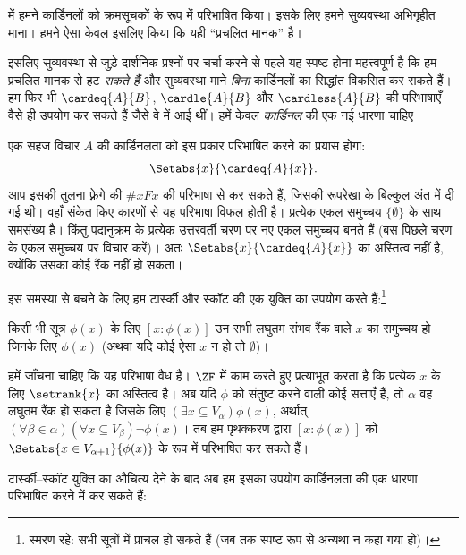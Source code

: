 \documentclass[../../../include/open-logic-section]{subfiles}
\begin{document}

 में हमने कार्डिनलों
को क्रमसूचकों के रूप में परिभाषित किया। इसके लिए हमने सुव्यवस्था अभिगृहीत
माना। हमने ऐसा केवल इसलिए किया कि यही ``प्रचलित मानक'' है।

इसलिए सुव्यवस्था से जुड़े दार्शनिक प्रश्नों पर चर्चा करने से पहले यह स्पष्ट
होना महत्त्वपूर्ण है कि हम प्रचलित मानक से हट \emph{सकते हैं} और सुव्यवस्था
माने \emph{बिना} कार्डिनलों का सिद्धांत विकसित कर सकते हैं। हम फिर भी
$\cardeq{A}{B}$, $\cardle{A}{B}$ और $\cardless{A}{B}$ की परिभाषाएँ वैसे
ही उपयोग कर सकते हैं जैसे वे  में आई थीं। हमें केवल
\emph{कार्डिनल} की एक नई धारणा चाहिए।

एक सहज विचार $A$ की कार्डिनलता को इस प्रकार परिभाषित करने का प्रयास होगा:
\[
	\Setabs{x}{\cardeq{A}{x}}.
\]
आप इसकी तुलना फ़्रेगे की $\#xFx$ की परिभाषा से कर सकते हैं, जिसकी रूपरेखा
 के बिल्कुल अंत में दी गई थी। वहाँ संकेत किए कारणों
से यह परिभाषा विफल होती है। प्रत्येक एकल समुच्चय $\{\emptyset\}$ के साथ
समसंख्य है। किंतु पदानुक्रम के प्रत्येक उत्तरवर्ती चरण पर नए एकल समुच्चय
बनते हैं (बस पिछले चरण के एकल समुच्चय पर विचार करें)। अतः
$\Setabs{x}{\cardeq{A}{x}}$ का अस्तित्व नहीं है, क्योंकि उसका कोई रैंक नहीं
हो सकता।

इस समस्या से बचने के लिए हम टार्स्की और स्कॉट की एक युक्ति का उपयोग करते
हैं:\footnote{स्मरण रहे: सभी सूत्रों में प्राचल हो सकते हैं (जब तक स्पष्ट
रूप से अन्यथा न कहा गया हो)।}

\begin{defn}
किसी भी सूत्र $\phi(x)$ के लिए $[x:\phi(x)]$ उन सभी लघुतम संभव रैंक वाले
$x$ का समुच्चय हो जिनके लिए $\phi(x)$ (अथवा यदि कोई ऐसा $x$ न हो तो
$\emptyset$)।
\end{defn}

हमें जाँचना चाहिए कि यह परिभाषा वैध है। $\ZF$ में काम करते हुए
 प्रत्याभूत करता है कि
प्रत्येक $x$ के लिए $\setrank{x}$ का अस्तित्व है। अब यदि $\phi$ को संतुष्ट
करने वाली कोई सत्ताएँ हैं, तो $\alpha$ वह लघुतम रैंक हो सकता है जिसके लिए
$(\exists x\subseteq V_\alpha)\phi(x)$, अर्थात्
$(\forall\beta\in\alpha)(\forall x\subseteq V_\beta)\lnot\phi(x)$। तब हम
पृथक्करण द्वारा $[x:\phi(x)]$ को
$\Setabs{x\in V_{\alpha+1}}{\phi(x)}$ के रूप में परिभाषित कर सकते हैं।

टार्स्की--स्कॉट युक्ति का औचित्य देने के बाद अब हम इसका उपयोग कार्डिनलता की
एक धारणा परिभाषित करने में कर सकते हैं:
\end{document}
